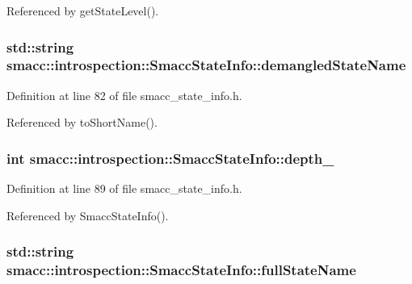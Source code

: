 Referenced by get\+State\+Level().

\subsubsection[{\texorpdfstring{demangled\+State\+Name}{demangledStateName}}]{\setlength{\rightskip}{0pt plus 5cm}std\+::string smacc\+::introspection\+::\+Smacc\+State\+Info\+::demangled\+State\+Name}\hypertarget{classsmacc_1_1introspection_1_1SmaccStateInfo_acf0014a819c23caad085ba6df13a17bf}{}\label{classsmacc_1_1introspection_1_1SmaccStateInfo_acf0014a819c23caad085ba6df13a17bf}


Definition at line 82 of file smacc\+\_\+state\+\_\+info.\+h.



Referenced by to\+Short\+Name().

\subsubsection[{\texorpdfstring{depth\+\_\+}{depth_}}]{\setlength{\rightskip}{0pt plus 5cm}int smacc\+::introspection\+::\+Smacc\+State\+Info\+::depth\+\_\+}\hypertarget{classsmacc_1_1introspection_1_1SmaccStateInfo_a7e97a482ca49057f27e638268d1a3189}{}\label{classsmacc_1_1introspection_1_1SmaccStateInfo_a7e97a482ca49057f27e638268d1a3189}


Definition at line 89 of file smacc\+\_\+state\+\_\+info.\+h.



Referenced by Smacc\+State\+Info().

\subsubsection[{\texorpdfstring{full\+State\+Name}{fullStateName}}]{\setlength{\rightskip}{0pt plus 5cm}std\+::string smacc\+::introspection\+::\+Smacc\+State\+Info\+::full\+State\+Name}\hypertarget{classsmacc_1_1introspection_1_1SmaccStateInfo_aef6053863f757bf9af16fe4da75c51de}{}\label{classsmacc_1_1introspection_1_1SmaccStateInfo_aef6053863f757bf9af16fe4da75c51de}


